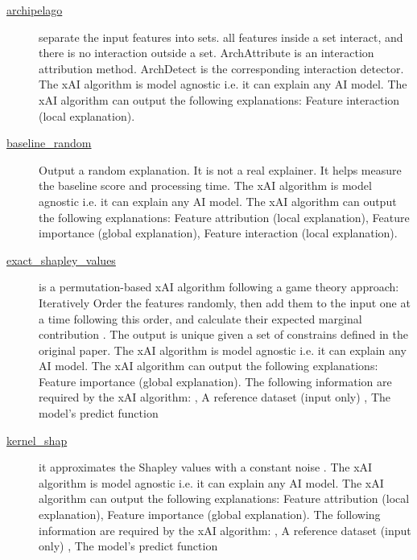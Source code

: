 \begin{description}


\item[\href{https://github.com/Karim-53/Compare-xAI/blob/main/explainers/archipelago.py}{archipelago}] 
 \citep{tsang2020does} 
separate the input features into sets. all features inside a set interact, and there is no interaction outside a set. ArchAttribute is an interaction attribution method. ArchDetect is the corresponding interaction detector. 
The xAI algorithm is model agnostic i.e. it can explain any AI model. 
The xAI algorithm can output the following explanations: Feature interaction (local explanation). 


\item[\href{https://github.com/Karim-53/Compare-xAI/blob/main/explainers/explainer_superclass.py}{baseline\_random}] 
 \citep{liu2021synthetic} 
Output a random explanation. It is not a real explainer. It helps measure the baseline score and processing time. 
The xAI algorithm is model agnostic i.e. it can explain any AI model. 
The xAI algorithm can output the following explanations: Feature attribution (local explanation), Feature importance (global explanation), Feature interaction (local explanation). 


\item[\href{https://github.com/Karim-53/Compare-xAI/blob/main/explainers/shap_explainer.py}{exact\_shapley\_values}] 
 \citep{shapley1953quota} 
is a permutation-based xAI algorithm following a game theory approach: Iteratively Order the features randomly, then add them to the input one at a time following this order, and calculate their expected marginal contribution \citep{sundararajan2020many}. The output is unique given a set of constrains defined in the original paper. 
The xAI algorithm is model agnostic i.e. it can explain any AI model. 
The xAI algorithm can output the following explanations: Feature importance (global explanation). 
The following information are required by the xAI algorithm: 
			 , A reference dataset (input only)
			 , The model's predict function

\item[\href{https://github.com/Karim-53/Compare-xAI/blob/main/explainers/shap_explainer.py}{kernel\_shap}] 
 \citep{lundberg2017unified} 
it approximates the Shapley values with a constant noise \citep{janzing2020feature}. 
The xAI algorithm is model agnostic i.e. it can explain any AI model. 
The xAI algorithm can output the following explanations: Feature attribution (local explanation), Feature importance (global explanation). 
The following information are required by the xAI algorithm: 
			 , A reference dataset (input only)
			 , The model's predict function


\end{description}
